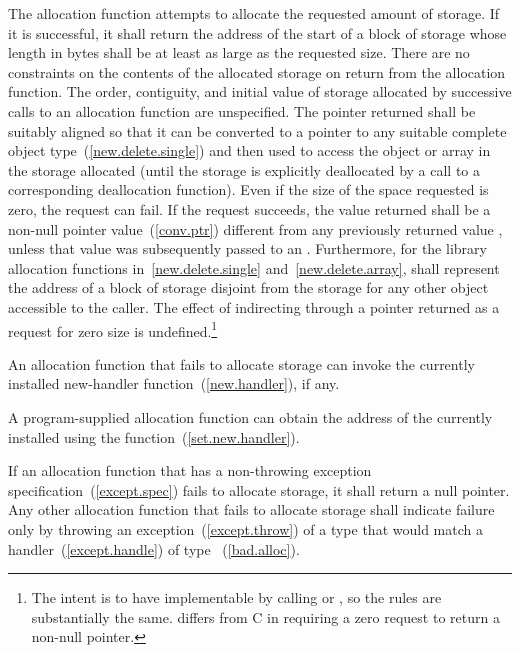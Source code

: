 \pnum
The allocation function attempts to allocate the requested amount of
storage. If it is successful, it shall return the address of the start
of a block of storage whose length in bytes shall be at least as large
as the requested size. There are no constraints on the contents of the
allocated storage on return from the allocation function. The order,
contiguity, and initial value of storage allocated by successive calls
to an allocation function are unspecified. The pointer returned shall be
suitably aligned so that it can be converted to a pointer to any
suitable complete object type~(\ref{new.delete.single})
and then used to access the object or array in the
storage allocated (until the storage is explicitly deallocated by a call
to a corresponding deallocation function). Even if the size of the space
requested is zero, the request can fail. If the request succeeds, the
value returned shall be a non-null pointer value~(\ref{conv.ptr})
 different from any previously returned value ,
unless that value  was subsequently passed to an
 .
Furthermore, for the library allocation functions
in~\ref{new.delete.single} and~\ref{new.delete.array},
 shall represent the address of a block of storage disjoint from the storage
for any other object accessible to the caller.
The effect of indirecting through a pointer
returned as a request for zero size is undefined.\footnote{The intent is
to have  implementable by
calling  or , so the rules are
substantially the same. \Cpp differs from C in requiring a zero request
to return a non-null pointer.}

\pnum
An allocation function that fails to allocate storage can invoke the
currently installed new-handler function~(\ref{new.handler}), if any.
\begin{note}
%
A program-supplied allocation function can obtain the address of the
currently installed  using the
 function~(\ref{set.new.handler}). \end{note}
If an allocation function that has a non-throwing
exception specification~(\ref{except.spec})
fails to allocate storage, it shall return a null pointer. Any other
allocation function that fails to allocate storage shall indicate
failure only by throwing an exception~(\ref{except.throw}) of a type
that would match a handler~(\ref{except.handle}) of type
~(\ref{bad.alloc}).

